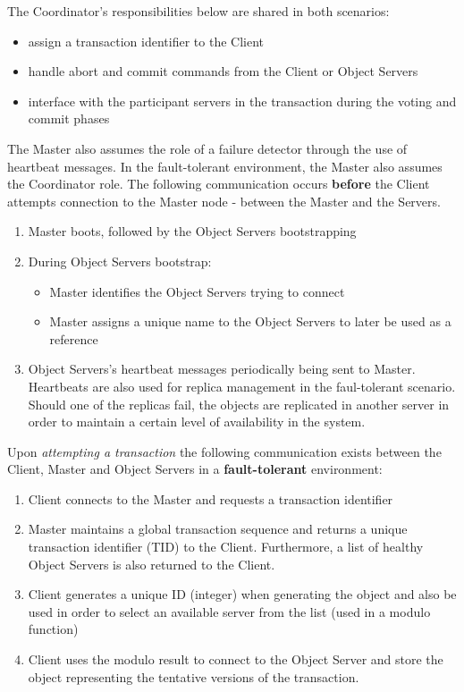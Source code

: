 \documentclass[times, 10pt,twocolumn]{article}
\begin{document}
The Coordinator's responsibilities below are shared in both scenarios:
\begin{itemize}[noitemsep,nolistsep]
\item assign a transaction identifier to the Client 
\item handle abort and commit commands from the Client or Object Servers 
\item interface with the participant servers in the transaction during the voting and commit phases 
\end{itemize}

The Master also assumes the role of a failure detector through the use of heartbeat messages. In the fault-tolerant environment, the Master also assumes the Coordinator role.
\label{sec:algor}
The following communication occurs {\bf before} the Client attempts connection to the Master node - between the Master and the Servers.

\begin{enumerate}
\item Master boots, followed by the Object Servers bootstrapping
\item During Object Servers bootstrap:
\begin{itemize}[noitemsep, nolistsep]
\item Master identifies the Object Servers trying to connect
\item Master assigns a unique name to the Object Servers to later be used as a reference
\end{itemize}
\item Object Servers's heartbeat messages periodically being sent to Master. Heartbeats are also used for replica management in the faul-tolerant scenario. Should one of the replicas fail, the objects are replicated in another server in order to maintain a certain level of availability in the system.
\end{enumerate}

Upon {\it attempting a transaction} the following communication exists between the Client, Master and Object Servers in a {\bf fault-tolerant} environment: 
\begin{enumerate}
\item Client connects to the Master and requests a transaction identifier 
\item Master maintains a global transaction sequence and returns a unique transaction identifier (TID) to the Client. Furthermore, a list of healthy Object Servers is also returned to the Client. 
\item Client generates a unique ID (integer) when generating the object and also be used in order to select an available server from the list (used in a modulo function)
\item Client uses the modulo result to connect to the Object Server and store the object representing the tentative versions of the transaction.
\end{enumerate}
\end{document}
